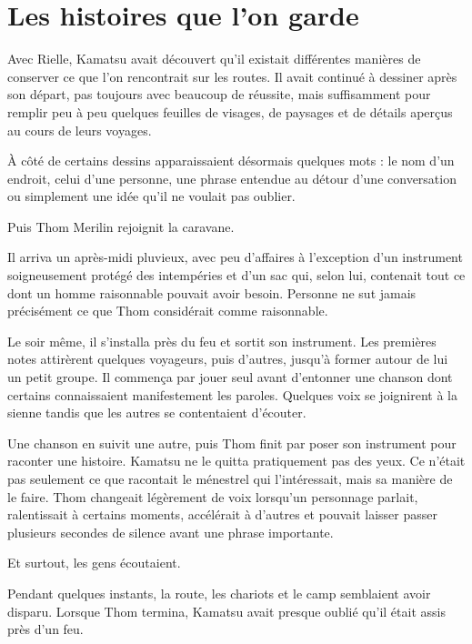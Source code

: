 \chapter{Les histoires que l'on garde}
\label{chap:histoires-que-lon-garde}

Avec Rielle, Kamatsu avait découvert qu'il existait différentes manières de
conserver ce que l'on rencontrait sur les routes. Il avait continué à dessiner
après son départ, pas toujours avec beaucoup de réussite, mais suffisamment
pour remplir peu à peu quelques feuilles de visages, de paysages et de détails
aperçus au cours de leurs voyages.

À côté de certains dessins apparaissaient désormais quelques mots : le nom
d'un endroit, celui d'une personne, une phrase entendue au détour d'une
conversation ou simplement une idée qu'il ne voulait pas oublier.

Puis Thom Merilin rejoignit la caravane.

\scenebreak

Il arriva un après-midi pluvieux, avec peu d'affaires à l'exception d'un
instrument soigneusement protégé des intempéries et d'un sac qui, selon lui,
contenait tout ce dont un homme raisonnable pouvait avoir besoin. Personne ne
sut jamais précisément ce que Thom considérait comme raisonnable.

Le soir même, il s'installa près du feu et sortit son instrument. Les premières
notes attirèrent quelques voyageurs, puis d'autres, jusqu'à former autour de
lui un petit groupe. Il commença par jouer seul avant d'entonner une chanson
dont certains connaissaient manifestement les paroles. Quelques voix se
joignirent à la sienne tandis que les autres se contentaient d'écouter.

Une chanson en suivit une autre, puis Thom finit par poser son instrument pour
raconter une histoire. Kamatsu ne le quitta pratiquement pas des yeux. Ce
n'était pas seulement ce que racontait le ménestrel qui l'intéressait, mais sa
manière de le faire. Thom changeait légèrement de voix lorsqu'un personnage
parlait, ralentissait à certains moments, accélérait à d'autres et pouvait
laisser passer plusieurs secondes de silence avant une phrase importante.

Et surtout, les gens écoutaient.

Pendant quelques instants, la route, les chariots et le camp semblaient avoir
disparu. Lorsque Thom termina, Kamatsu avait presque oublié qu'il était assis
près d'un feu.

\scenebreak

